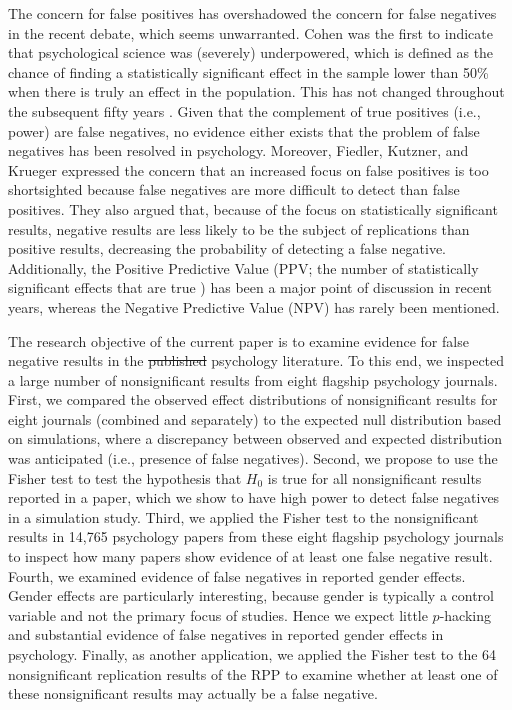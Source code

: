 \documentclass{article}
\providecommand{\DIFaddtex}[1]{{\protect\color{blue}\uwave{#1}}} %
\providecommand{\DIFdeltex}[1]{{\protect\color{red}\sout{#1}}}                      %
\providecommand{\DIFaddbegin}{} %
\providecommand{\DIFaddend}{} %
\providecommand{\DIFdelbegin}{} %
\providecommand{\DIFdelend}{} %
\providecommand{\DIFadd}[1]{\texorpdfstring{\DIFaddtex{#1}}{#1}} %
\providecommand{\DIFdel}[1]{\texorpdfstring{\DIFdeltex{#1}}{}} %
\begin{document}
The concern for false positives has overshadowed the concern for false negatives in the recent debate, which seems unwarranted. Cohen \cite{Cohen1962-jc} was the first to indicate that psychological science was (severely) underpowered, which is defined as the chance of finding a statistically significant effect in the sample \DIFaddbegin \DIFadd{being }\DIFaddend lower than 50\% when there is truly an effect in the population. This has not changed throughout the subsequent fifty years \cite{Bakker2012-tf,Fraley2014-xs}. Given that the complement of true positives (i.e., power) are false negatives, no evidence either exists that the problem of false negatives has been resolved in psychology. Moreover, Fiedler, Kutzner, and Krueger \cite{Fiedler2012-gx} expressed the concern that an increased focus on false positives is too shortsighted because false negatives are more difficult to detect than false positives. They also argued that, because of the focus on statistically significant results, negative results are less likely to be the subject of replications than positive results, decreasing the probability of detecting a false negative. Additionally, the Positive Predictive Value (PPV; the number of statistically significant effects that are true \cite{Ioannidis2005-am}) has been a major point of discussion in recent years, whereas the Negative Predictive Value (NPV) has rarely been mentioned.

The research objective of the current paper is to examine evidence for false negative results in the \DIFdelbegin \DIFdel{published }\DIFdelend psychology literature. To this end, we inspected a large number of nonsignificant results from eight flagship psychology journals. First, we compared the observed effect distributions of nonsignificant results for eight journals (combined and separately) to the expected null distribution based on simulations, where a discrepancy between observed and expected distribution was anticipated (i.e., presence of false negatives). Second, we propose to use the Fisher test to test the hypothesis that $H_0$ is true for all nonsignificant results reported in a paper, which we show to have high power to detect false negatives in a simulation study. Third, we applied the Fisher test to the nonsignificant results in 14,765 psychology papers from these eight flagship psychology journals to inspect how many papers show evidence of at least one false negative result. Fourth, we examined evidence of false negatives in reported gender effects. Gender effects are particularly interesting, because gender is typically a control variable and not the primary focus of studies. Hence we expect little $p$-hacking and substantial evidence of false negatives in reported gender effects in psychology. Finally, as another application, we applied the Fisher test to the 64 nonsignificant replication results of the RPP \cite{Open_Science_Collaboration2015-zs} to examine whether at least one of these nonsignificant results may actually be a false negative. 
\end{document}
